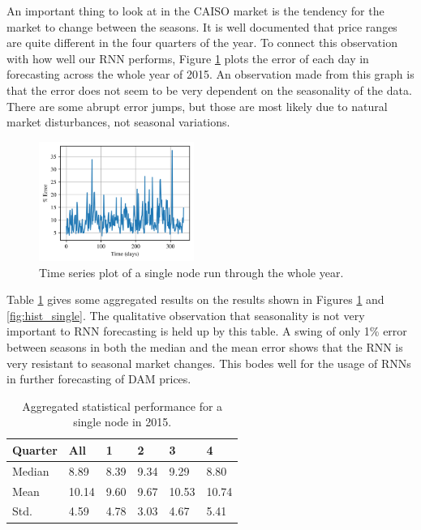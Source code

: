\documentclass[sigconf]{acmart}
\begin{document}
An important thing to look at in the CAISO market is the tendency for the market to change between the seasons. It is well documented that price ranges are quite different in the four quarters of the year. To connect this observation with how well our RNN performs, Figure \ref{fig:time_single} plots the error of each day in forecasting across the whole year of 2015. An observation made from this graph is that the error does not seem to be very dependent on the seasonality of the data. There are some abrupt error jumps, but those are most likely due to natural market disturbances, not seasonal variations. 

\begin{figure}[h]
\includegraphics[width=0.45\textwidth]{fig_8.png}
\caption{Time series plot of a single node run through the whole year.}
\label{fig:time_single}
\end{figure}

Table \ref{tab:single} gives some aggregated results on the results shown in Figures \ref{fig:time_single} and \ref{fig:hist_single}. The qualitative observation that seasonality is not very important to RNN forecasting is held up by this table. A swing of only 1\% error between seasons in both the median and the mean error shows that the RNN is very resistant to seasonal market changes. This bodes well for the usage of RNNs in further forecasting of DAM prices. 

\begin{table}[h]
\begin{tabular}{llllll}
\hline
\hline
Quarter & All   & 1    & 2    & 3     & 4     \\
\hline
Median  & 8.89  & 8.39 & 9.34 & 9.29  & 8.80  \\
Mean    & 10.14 & 9.60 & 9.67 & 10.53 & 10.74 \\
Std.    & 4.59  & 4.78 & 3.03 & 4.67  & 5.41 \\
\hline
\hline
\end{tabular}
\caption{Aggregated statistical performance for a single node in 2015.}
\label{tab:single}
\end{table}
\end{document}
